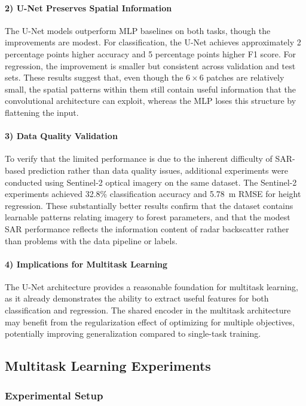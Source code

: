 \paragraph{2) U-Net Preserves Spatial Information} The U-Net models outperform MLP baselines on both tasks, though the improvements are modest. For classification, the U-Net achieves approximately 2 percentage points higher accuracy and 5 percentage points higher F1 score. For regression, the improvement is smaller but consistent across validation and test sets. These results suggest that, even though the $6\times 6$ patches are relatively small, the spatial patterns within them still contain useful information that the convolutional architecture can exploit, whereas the MLP loses this structure by flattening the input.

\paragraph{3) Data Quality Validation} To verify that the limited performance is due to the inherent difficulty of SAR-based prediction rather than data quality issues, additional experiments were conducted using Sentinel-2 optical imagery on the same dataset. The Sentinel-2 experiments achieved 32.8\% classification accuracy and 5.78~m RMSE for height regression. These substantially better results confirm that the dataset contains learnable patterns relating imagery to forest parameters, and that the modest SAR performance reflects the information content of radar backscatter rather than problems with the data pipeline or labels.

\paragraph{4) Implications for Multitask Learning} The U-Net architecture provides a reasonable foundation for multitask learning, as it already demonstrates the ability to extract useful features for both classification and regression. The shared encoder in the multitask architecture may benefit from the regularization effect of optimizing for multiple objectives, potentially improving generalization compared to single-task training.

\subsection{Multitask Learning Experiments}
\label{subsec:treesat_mtl}

\subsubsection{Experimental Setup}

